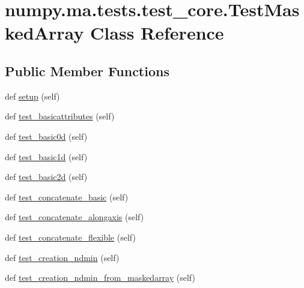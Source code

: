 \hypertarget{classnumpy_1_1ma_1_1tests_1_1test__core_1_1TestMaskedArray}{}\section{numpy.\+ma.\+tests.\+test\+\_\+core.\+Test\+Masked\+Array Class Reference}
\label{classnumpy_1_1ma_1_1tests_1_1test__core_1_1TestMaskedArray}
\subsection*{Public Member Functions}
\begin{DoxyCompactItemize}
\item 
def \hyperlink{classnumpy_1_1ma_1_1tests_1_1test__core_1_1TestMaskedArray_ad7a25a2b2ec395a20ce646e04748e2ee}{setup} (self)
\item 
def \hyperlink{classnumpy_1_1ma_1_1tests_1_1test__core_1_1TestMaskedArray_ad9f24ad0f4be8aeefecaeed1654dfc1f}{test\+\_\+basicattributes} (self)
\item 
def \hyperlink{classnumpy_1_1ma_1_1tests_1_1test__core_1_1TestMaskedArray_a08745d38b94cc7591653bbc5e8d4098b}{test\+\_\+basic0d} (self)
\item 
def \hyperlink{classnumpy_1_1ma_1_1tests_1_1test__core_1_1TestMaskedArray_ae24b4f9bbf6aa21aa5f1fc7c3d458411}{test\+\_\+basic1d} (self)
\item 
def \hyperlink{classnumpy_1_1ma_1_1tests_1_1test__core_1_1TestMaskedArray_a7346964c489dd0d9c1a7441073422477}{test\+\_\+basic2d} (self)
\item 
def \hyperlink{classnumpy_1_1ma_1_1tests_1_1test__core_1_1TestMaskedArray_a542e6bf9422e3bbbbfe00308a2ba6983}{test\+\_\+concatenate\+\_\+basic} (self)
\item 
def \hyperlink{classnumpy_1_1ma_1_1tests_1_1test__core_1_1TestMaskedArray_a01aac010f57f9200c5ecda048a2c3595}{test\+\_\+concatenate\+\_\+alongaxis} (self)
\item 
def \hyperlink{classnumpy_1_1ma_1_1tests_1_1test__core_1_1TestMaskedArray_a2fbaa0d60b98c9adc89f9735e79295b6}{test\+\_\+concatenate\+\_\+flexible} (self)
\item 
def \hyperlink{classnumpy_1_1ma_1_1tests_1_1test__core_1_1TestMaskedArray_a8041d67aa9af8d816977bea449839d29}{test\+\_\+creation\+\_\+ndmin} (self)
\item 
def \hyperlink{classnumpy_1_1ma_1_1tests_1_1test__core_1_1TestMaskedArray_a0ffcbe8c738222eef67b35f47b2edcc6}{test\+\_\+creation\+\_\+ndmin\+\_\+from\+\_\+maskedarray} (self)

\end{DoxyCompactItemize}
